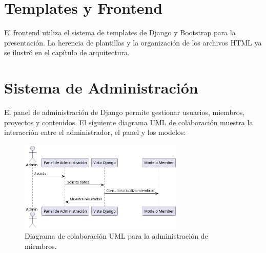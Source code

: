 \section{Templates y Frontend}
El frontend utiliza el sistema de templates de Django y Bootstrap para la presentación. La herencia de plantillas y la organización de los archivos HTML ya se ilustró en el capítulo de arquitectura.
\newpage
\section{Sistema de Administración}
El panel de administración de Django permite gestionar usuarios, miembros, proyectos y contenidos. El siguiente diagrama UML de colaboración muestra la interacción entre el administrador, el panel y los modelos:
\begin{figure}[H]
	\centering
	\includegraphics[width=0.7\textwidth]{uml/admin-miembros.png}
	\caption{Diagrama de colaboración UML para la administración de miembros.}
\end{figure}
